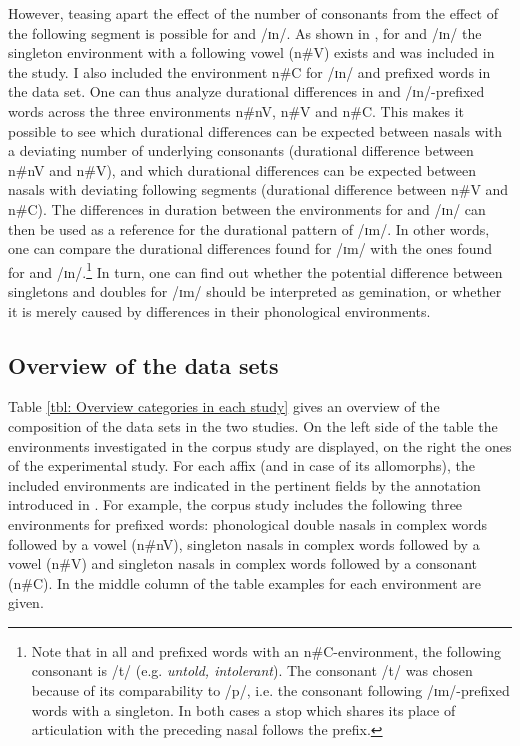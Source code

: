 However, teasing apart the effect of the number of consonants from the effect of the following segment is possible for  and /ɪn/. As shown in , for  and /ɪn/ the singleton environment with a following vowel (n\#V) exists and was included in the study. I also included the environment n\#C for /ɪn/ and prefixed words in the data set.
 One can thus analyze durational differences in  and /ɪn/-prefixed words across the three environments  n\#nV, n\#V and n\#C. 
This makes it possible to see which durational differences can be expected between nasals with a deviating number of underlying consonants (durational difference between n\#nV and n\#V), and which durational differences can be expected between nasals with deviating following segments (durational difference between n\#V and n\#C). 
The differences in duration between the environments for  and /ɪn/ can then be used as a reference for the durational pattern of /ɪm/. 
In other words, one can compare the durational differences found for /ɪm/ with the ones found for  and /ɪn/.\footnote{Note that in all  and prefixed words with an n\#C-environment, the following consonant is /t/ (e.g. \textit{untold, intolerant}). The consonant /t/ was chosen because of its comparability to /p/, i.e. the consonant following /ɪm/-prefixed words with a singleton. In both cases a stop which shares its place of articulation with the preceding nasal follows the prefix.}
In turn, one can find out whether the potential difference between singletons and doubles for /ɪm/ should be interpreted as gemination, or whether it is merely caused by differences in their phonological environments.





\subsection{Overview of the data sets}

Table \ref{tbl: Overview categories in each study} gives an overview of the composition of the data sets in the two studies.
On the left side of the table the environments investigated in the corpus study are displayed, on the right the ones of the experimental study. 
For each affix (and in case of  its allomorphs), the included environments are indicated in the pertinent fields by the annotation introduced in .
For example, the corpus study includes the following three environments for prefixed words: phonological double nasals in complex words followed by a vowel (n\#nV), singleton nasals in complex words followed by a vowel (n\#V) and singleton nasals in complex words followed by a consonant (n\#C). In the middle column of the table examples for each environment are given.

